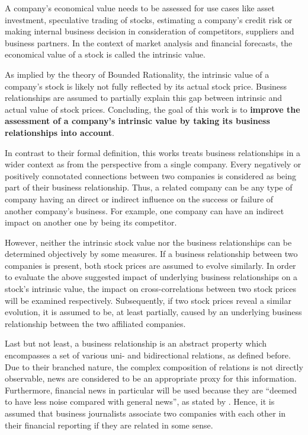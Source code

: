 A company's economical value needs to be assessed for use cases like asset investment, speculative trading of stocks, estimating a company's credit risk or making internal business decision in consideration of competitors, suppliers and business partners. In the context of market analysis and financial forecasts, the economical value of a stock is called the intrinsic value.


As implied by the theory of Bounded Rationality, the intrinsic value of a company's stock is likely not fully reflected by its actual stock price. Business relationships are assumed to partially explain this gap between intrinsic and actual value of stock prices. Concluding, the goal of this work is to \textbf{improve the assessment of a company's intrinsic value by taking its business relationships into account}.

In contrast to their formal definition, this works treats business relationships in a wider context as from the perspective from a single company. Every negatively or positively connotated connections between two companies is considered as being part of their business relationship. Thus, a related company can be any type of company having an direct or indirect influence on the success or failure of another company's business. For example, one company can have an indirect impact on another one by being its competitor.

However, neither the intrinsic stock value nor the business relationships can be determined objectively by some measures. If a business relationship between two companies is present, both stock prices are assumed to evolve similarly. In order to evaluate the above suggested impact of underlying business relationships on a stock's intrinsic value, the impact on cross-correlations between two stock prices will be examined respectively. Subsequently, if two stock prices reveal a similar evolution, it is assumed to be, at least partially, caused by an underlying business relationship between the two affiliated companies.

Last but not least, a business relationship is an abstract property which encompasses a set of various uni- and bidirectional relations, as defined before. Due to their branched nature, the complex composition of relations is not directly observable, news are considered to be an appropriate proxy for this information. Furthermore, financial news in particular will be used because they are \enquote{deemed to have less noise compared with general news}, as stated by \citet{KhadjehNassirtoussi2014TextReview}. Hence, it is assumed that business journalists associate two companies with each other in their financial reporting if they are related in some sense.


